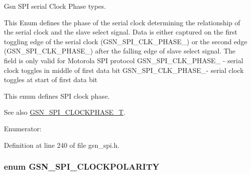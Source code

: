 Gsn SPI serial Clock Phase types. 

This Enum defines the phase of the serial clock determining the relationship of the serial clock and the slave select signal. Data is either captured on the first toggling edge of the serial clock (GSN\_\-SPI\_\-CLK\_\-PHASE\_) or the second edge (GSN\_\-SPI\_\-CLK\_\-PHASE\_) after the falling edge of slave select signal. The field is only valid for Motorola SPI protocol GSN\_\-SPI\_\-CLK\_\-PHASE\_ -\/ serial clock toggles in middle of first data bit GSN\_\-SPI\_\-CLK\_\-PHASE\_-\/ serial clock toggles at start of first data bit

This enum defines SPI clock phase. \begin{DoxySeeAlso}{See also}
\hyperlink{a00655_ga1399b803d30956e8ed6f4929033329ad}{GSN\_\-SPI\_\-CLOCKPHASE\_\-T}. 
\end{DoxySeeAlso}
\begin{Desc}
\item[Enumerator: ]\par
\begin{description}
\item[{\em 
\hypertarget{a00655_ggad25e484c9005210b7db2528764be5034aab08aff0047af6002867e4d4395f9e86}{
GSN\_\-SPI\_\-CLK\_\-PHASE\_\-0}
\label{a00655_ggad25e484c9005210b7db2528764be5034aab08aff0047af6002867e4d4395f9e86}
}]\item[{\em 
\hypertarget{a00655_ggad25e484c9005210b7db2528764be5034ae00df0dc7e8ab0bb7af357af893ed703}{
GSN\_\-SPI\_\-CLK\_\-PHASE\_\-180}
\label{a00655_ggad25e484c9005210b7db2528764be5034ae00df0dc7e8ab0bb7af357af893ed703}
}]\end{description}
\end{Desc}



Definition at line 240 of file gsn\_\-spi.h.

\hypertarget{a00655_ga6d27ddbf02c08f4f80f88328bb907f94}{
\subsubsection[{GSN\_\-SPI\_\-CLOCKPOLARITY}]{\setlength{\rightskip}{0pt plus 5cm}enum {\bf GSN\_\-SPI\_\-CLOCKPOLARITY}}}
\label{a00655_ga6d27ddbf02c08f4f80f88328bb907f94}


